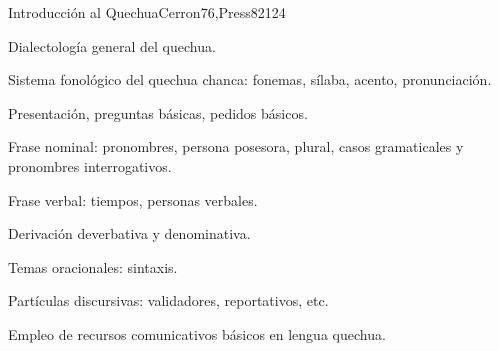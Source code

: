 \begin{syllabus}
\begin{competences}
    \item {}
    \item {}
    \item {}
    \item {}
\end{competences}

\begin{unit}{Introducción al Quechua}{}{Cerron76,Press82}{12}{4}
   \begin{topics}
      \item Dialectología general del quechua.
      \item Sistema fonológico del quechua chanca: fonemas, sílaba, acento, pronunciación.
      \item Presentación, preguntas básicas, pedidos básicos.
      \item Frase nominal: pronombres, persona posesora, plural, casos gramaticales y pronombres interrogativos.
      \item Frase verbal: tiempos, personas verbales.
      \item Derivación deverbativa y denominativa.
      \item Temas oracionales: sintaxis.
      \item Partículas discursivas: validadores, reportativos, etc.
                
   \end{topics}

   \begin{learningoutcomes}
      \item Empleo de recursos comunicativos básicos en lengua quechua.
   \end{learningoutcomes}
\end{unit}



\begin{coursebibliography}
\end{coursebibliography}

\end{syllabus}
